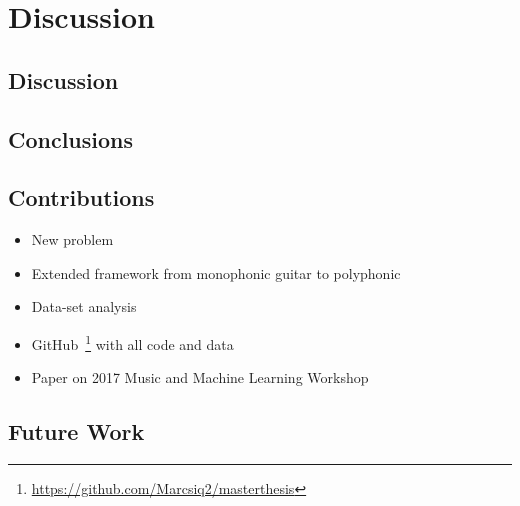 \chapter{Discussion}
\label{chap:discussion}

\section{Discussion}

\section{Conclusions}

\section{Contributions}
\begin{itemize}[noitemsep]
\item New problem 
\item Extended framework from monophonic guitar to polyphonic
\item Data-set analysis
\item GitHub~\footnote{\url{https://github.com/Marcsiq2/masterthesis}} with all code and data
\item Paper on 2017 Music and Machine Learning Workshop
\end{itemize}

\section{Future Work}

\cleardoublepage

